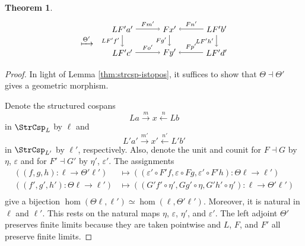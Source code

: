 \documentclass{amsart}
\newcommand{\from}{\colon}
\newcommand{\xto}[1]{\xrightarrow{#1}}
\newcommand{\xgets}[1]{\xleftarrow{#1}}
\newtheorem{theorem}{Theorem}[section]
\theoremstyle{remark}
\theoremstyle{definition}
\begin{document}
\begin{theorem}
\[\begin{tikzpicture}
\begin{scope}[shift={(3,0)}]
      \node (1) at (0,0.5) { $ \xmapsto{ \Theta' } $ };
      \end{scope}
      \begin{scope}[shift={(6.5,0)}]
      \node (1) at (-2,1) {\( LF'a' \)};
      \node (2) at (0,1) {\( Fx' \)};
      \node (3) at (2,1) {\( LF'b' \)};
      \node (4) at (-2,0) {\( LF'c' \)};
      \node (5) at (0,0) {\( Fy' \)};
      \node (6) at (2,0) {\( LF'd' \)};
      \draw [->] (1) to node [above] {\scriptsize{\( Fm' \)}} (2);
      \draw [->] (3) to node [above] {\scriptsize{\( Fn' \)}} (2);
      \draw [->] (4) to node [above] {\scriptsize{\( Fo' \)}} (5);
      \draw [->] (6) to node [above] {\scriptsize{\( Fp' \)}} (5);
      \draw [->] (1) to node [left] {\scriptsize{\( LF'f' \)}} (4);
      \draw [->] (2) to node [left] {\scriptsize{\( Fg' \)}} (5);
      \draw [->] (3) to node [left] {\scriptsize{\( LF'h' \)}} (6);  
      \end{scope}
    \end{tikzpicture}
  \]  
\end{theorem}

\begin{proof}

  In light of Lemma \ref{thm:strcsp-istopos}, it suffices to show that
  $ \Theta \dashv \Theta' $ gives a geometric morphism.

  Denote the structured cospans
  \[
    La \xto{m} x \xgets{n} Lb
  \]
  in $ \StrCsp_{ L } $ by $ \ell $ and  
  \[
    L'a' \xto{ m'} x' \xgets{ n'} L'b'
  \]
  in $ \StrCsp_{ L' } $ by $ \ell' $,
  respectively. Also, denote the unit and counit for $F \dashv G$ by
  $ \eta $, $ \varepsilon $ and for $ F' \dashv G' $ by $ \eta' $, $
  \varepsilon' $.  The assignments
  \begin{align}
    \left(
      ( f,g,h ) \from \ell \to \Theta' \ell'
      \right)
    & \mapsto
    \left(
      ( \varepsilon' \circ F'f , \varepsilon \circ Fg , \varepsilon'
      \circ F'h )
      \from \Theta \ell \to \ell'
      \right) \\
      \left(
      ( f',g',h' ) \from \Theta \ell \to \ell'
      \right)
    & \mapsto
      \left(
      ( G'f' \circ \eta', Gg' \circ \eta , G'h' \circ \eta' )
      \from \ell \to \Theta' \ell'
      \right) \\
  \end{align}
  give a bijection $ \hom ( \Theta \ell , \ell' ) \simeq \hom ( \ell ,
  \Theta' \ell' ) $. Moreover, it is natural in $ \ell $ and $ \ell'
  $. This rests on the natural maps $ \eta $, $ \varepsilon $, $ \eta'
  $, and $ \varepsilon' $. The left adjoint $ \Theta' $ preserves
  finite limits because they are taken pointwise and $ L $, $ F $, and
  $ F' $ all preserve finite limits.

\end{proof}
\end{document}
